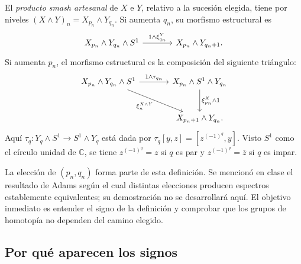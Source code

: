 \begin{defi}\label{defi:c10-smash-artesanal}
El \emph{producto smash artesanal} de $X$ e $Y$, relativo a la sucesión elegida, tiene por niveles $(X\wedge Y)_n=X_{p_n}\wedge Y_{q_n}$. Si aumenta $q_n$, su morfismo estructural es
\[
\begin{tikzcd}[column sep=large]
X_{p_n}\wedge Y_{q_n}\wedge S^1
\arrow[r,"1\wedge\xi^Y_{q_n}"] & X_{p_n}\wedge Y_{q_n+1}.
\end{tikzcd}
\]
Si aumenta $p_n$, el morfismo estructural es la composición del siguiente triángulo:
\[
\begin{tikzcd}[column sep=large,row sep=large]
X_{p_n}\wedge Y_{q_n}\wedge S^1
\arrow[r,"1\wedge\tau_{q_n}"] \arrow[dr,swap,"\xi^{X\wedge Y}_n"]
& X_{p_n}\wedge S^1\wedge Y_{q_n}
\arrow[d,"\xi^X_{p_n}\wedge1"]\\
& X_{p_n+1}\wedge Y_{q_n}.
\end{tikzcd}
\]
Aquí $\tau_q\colon Y_q\wedge S^1\to S^1\wedge Y_q$ está dada por $\tau_q[y,z]=[z^{(-1)^q},y]$. Visto $S^1$ como el círculo unidad de $\mathbb C$, se tiene $z^{(-1)^q}=z$ si $q$ es par y $z^{(-1)^q}=\overline z$ si $q$ es impar.
\end{defi}

La elección de $(p_n,q_n)$ forma parte de esta definición. Se mencionó en clase el resultado de Adams según el cual distintas elecciones producen espectros establemente equivalentes; su demostración no se desarrollará aquí. El objetivo inmediato es entender el signo de la definición y comprobar que los grupos de homotopía no dependen del camino elegido.

\subsection{Por qué aparecen los signos}

